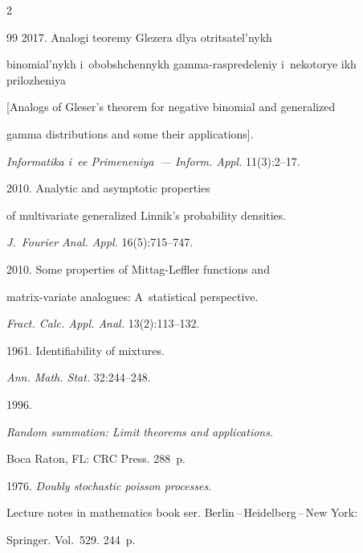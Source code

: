 \begin{multicols}{2}
{{\begin{thebibliography}{99}
 2017. Analogi teoremy Glezera dlya ot\-ri\-tsa\-tel'\-nykh 


binomial'nykh i~obobshchennykh gamma-raspredeleniy i~nekotorye ikh prilozheniya 


[Analogs of Gleser's theorem for negative binomial and generalized


 gamma distributions and some their applications]. 


 \textit{Informatika i~ee Primeneniya~--- Inform. Appl.} 11(3):2--17.







 2010. Analytic and asymptotic properties 


of multivariate generalized Linnik's probability densities. 


\textit{J.~Fourier Anal. Appl.} 16(5):715--747.







 2010. Some properties of Mittag-Leffler functions and


matrix-variate analogues: A~statistical perspective. 


\textit{Fract. Calc. Appl. Anal.} 13(2):113--132.







 1961. Identifiability of mixtures. 


\textit{Ann. Math. Stat.} 32:244--248.







 1996. 


\textit{Random summation: Limit theorems and applications}. 


Boca Raton, FL: CRC Press. 288~p.







 1976. \textit{Doubly stochastic poisson processes}. 


Lecture notes in mathematics book ser. Berlin\,--\,Heidelberg\,--\,New York: 


Springer.  Vol.~529. 244~p.






\end{thebibliography}}}
\end{multicols}
